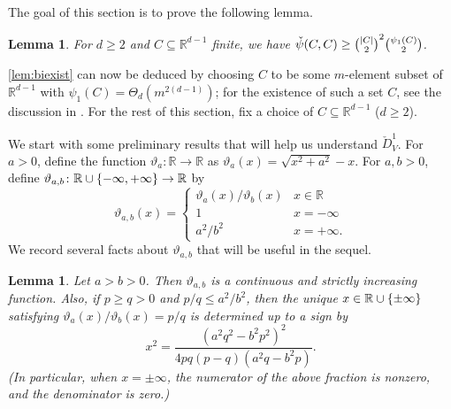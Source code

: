 \documentclass[11pt]{amsart}
\newtheorem{lemma}[theorem]{Lemma}
\theoremstyle{definition}
\DeclarePairedDelimiter{\set}{\{}{\}}
\DeclarePairedDelimiter{\abs}{\lvert}{\rvert}
\newcommand{\RR}{\mathbb{R}}
\begin{document}
The goal of this section is to prove the following lemma.
\begin{lemma} \label{lem:psicc}
For $d \geq 2$ and $C \subseteq \RR^{d-1}$ finite, we have $\check \psi(C, C) \geq \binom{\abs{C}}{2}^2 \binom{\psi_1(C)}{2}$.
\end{lemma}
\cref{lem:biexist} can now be deduced by 
choosing $C$ to be some $m$-element subset of $\RR^{d-1}$ with $\psi_1(C) = \Theta_d(m^{2(d-1)})$; for the existence of such a set $C$, see the discussion in .  For the rest of this section, fix a choice of $C \subseteq \RR^{d-1}$ ($d\geq 2$).


We start with some preliminary results that will help us understand $\check D^1_V$.  For $a > 0$, define the function $\vartheta_a \colon \RR \to \RR$ as $\vartheta_a(x) = \sqrt{x^2+a^2}-x$. For $a, b > 0$, define $\vartheta_{a,b}\colon \RR \cup \set{-\infty,+\infty} \to \RR$ by
\[\vartheta_{a,b}(x) = \begin{cases}
\vartheta_a(x)/\vartheta_b(x) & x \in \RR \\
1 & x = -\infty \\
a^2/b^2 & x = +\infty.
\end{cases}\]
We record several facts about $\vartheta_{a,b}$ that will be useful in the sequel.
\begin{lemma} \label{lem:theta}
Let $a > b > 0$.  Then $\vartheta_{a,b}$ is a continuous and strictly increasing function. Also, if $p \geq q > 0$ and $p/q \leq a^2/b^2$, then the unique $x \in \RR \cup \set{\pm\infty}$ satisfying $\vartheta_a(x)/\vartheta_b(x)= p/q$ is determined up to a sign by
\[x^2 = \frac{(a^2q^2-b^2p^2)^2}{4pq(p-q)(a^2q-b^2p)}.\]
(In particular, when $x = \pm \infty$, the numerator of the above fraction is nonzero, and the denominator is zero.)
\end{lemma}
\end{document}
